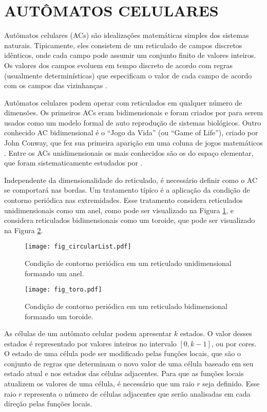 \section{AUTÔMATOS CELULARES}
\label{sec:acs}
Autômatos celulares (ACs) são idealizações matemáticas simples dos sistemas naturais. Tipicamente, eles consistem de um reticulado de campos discretos idênticos, onde cada campo pode assumir um conjunto finito de valores inteiros. Os valores dos campos evoluem em tempo discreto de acordo com regras (usualmente determinísticas) que especificam o valor de cada campo de acordo com os campos das vizinhanças \cite{wolfram1994cellular}.


Autômatos celulares podem operar com reticulados em qualquer número de dimensões. Os primeiros ACs eram bidimensionais e foram criados por  para serem usados como um modelo formal de auto reprodução de sistemas biológicos. Outro conhecido AC bidimensional é o ``Jogo da Vida'' (ou ``Game of Life''), criado por John Conway, que fez sua primeira aparição em uma coluna de jogos matemáticos \cite{GardnerM1970}. Entre os ACs unidimensionais os mais conhecidos são os do espaço elementar, que foram sistematicamente estudados por .

Independente da dimensionalidade do reticulado, é necessário definir como o AC se comportará nas bordas. Um tratamento típico é a aplicação da condição de contorno periódica nas extremidades. Esse tratamento considera reticulados unidimensionais como um anel, como pode ser visualizado na Figura \ref{fig:anel}, e considera reticulados bidimensionais como um toroide, que pode ser visualizado na Figura \ref{fig:toro}.  
	\begin{figure}[h!]
	  \centering
	  \texttt{[image: fig\_circularList.pdf]}
	  \caption{Condição de contorno periódica em um reticulado unidimensional formando um anel.}
	  \label{fig:anel}
	\end{figure}

	\begin{figure}[h!]
	  \centering
  	  \texttt{[image: fig\_toro.pdf]}
	  \caption{Condição de contorno periódica em um reticulado bidimensional formando um toroide.}
	  \label{fig:toro}
	\end{figure}

As células de um autômato celular podem apresentar $k$ estados. O valor desses estados é representado por valores inteiros no intervalo $[0, k-1]$, ou por cores. O estado de uma célula pode ser modificado pelas funções locais, que são o conjunto de regras que determinam o novo valor de uma célula baseado em seu estado atual e nos estados das células adjacentes. Para que as funções locais atualizem os valores de uma célula, é necessário que um raio $r$ seja definido. Esse raio $r$ representa o número de células adjacentes que serão analisadas em cada direção pelas funções locais.

